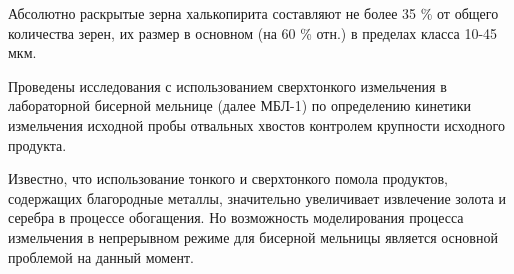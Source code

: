Абсолютно раскрытые зерна халькопирита составляют не более 35 \% от
общего количества зерен, их размер в основном (на 60 \% отн.) в пределах
класса 10-45 мкм.

% 

Проведены исследования с использованием сверхтонкого измельчения в
лабораторной бисерной мельнице (далее МБЛ-1) по определению кинетики
измельчения исходной пробы отвальных хвостов контролем крупности
исходного продукта.

Известно, что использование тонкого и сверхтонкого помола продуктов,
содержащих благородные металлы, значительно увеличивает извлечение
золота и серебра в процессе обогащения. Но возможность моделирования
процесса измельчения в непрерывном режиме для бисерной мельницы является
основной проблемой на данный момент.

